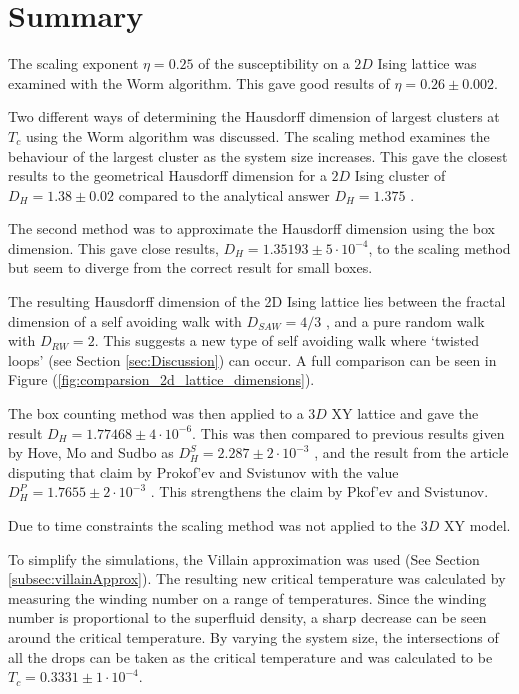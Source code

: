 \section{Summary}
\label{sec:Summary}

The scaling exponent $\eta = 0.25$ of the susceptibility on a $2D$ Ising lattice was examined with the Worm algorithm. This gave good results of $\eta = 0.26 \pm 0.002$.

Two different ways of determining the Hausdorff dimension of largest clusters at $T_c$ using the Worm algorithm was discussed. The scaling method examines the behaviour of the largest cluster as the system size increases. This gave the closest results to the geometrical Hausdorff dimension for a $2D$ Ising cluster of $D_H = 1.38 \pm 0.02$ compared to the analytical answer $D_H = 1.375$ \cite{Duplantier:GeoHausdorff}.

The second method was to approximate the Hausdorff dimension using the box dimension. This gave close results, $D_H = 1.35193 \pm 5 \cdot 10^{-4}$, to the scaling method but seem to diverge from the correct result for small boxes.

The resulting Hausdorff dimension of the 2D Ising lattice lies between the fractal dimension of a self avoiding walk with $D_{SAW} = 4/3$ \cite{Vilgis:FlorySAW}, and a pure random walk with $D_{RW} = 2$. This suggests a new type of self avoiding walk where `twisted loops' (see Section \ref{sec:Discussion}) can occur. A full comparison can be seen in Figure (\ref{fig:comparsion_2d_lattice_dimensions}).

The box counting method was then applied to a $3D$ XY lattice and gave the result $D_H = 1.77468 \pm 4 \cdot 10^{-6}$. This was then compared to previous results given by Hove, Mo and Sudbo as $D_H^S = 2.287 \pm 2 \cdot 10^{-3}$ \cite{Hove:hausdorff_crit_fluctuations}, and the result from the article disputing that claim by Prokof'ev and Svistunov with the value $D_H^P = 1.7655 \pm 2 \cdot 10^{-3}$ \cite{Prokofev:comment_on_hove_hausdorff_crit_fluct}. This strengthens the claim by Pkof'ev and Svistunov.

Due to time constraints the scaling method was not applied to the $3D$ XY model.

To simplify the simulations, the Villain approximation was used (See Section \ref{subsec:villainApprox}). The resulting new critical temperature was calculated by measuring the winding number on a range of temperatures. Since the winding number is proportional to the superfluid density, a sharp decrease can be seen around the critical temperature. By varying the system size, the intersections of all the drops can be taken as the critical temperature and was calculated to be $T_c = 0.3331 \pm 1 \cdot 10^{-4}$.

